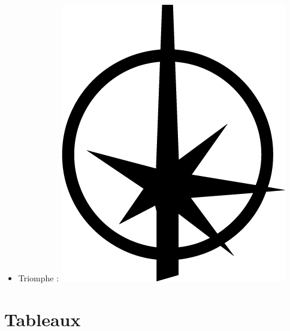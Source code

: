 \documentclass{article}
\begin{document}
\begin{multicols}{3}
\begin{itemize}
		\item Triomphe : {\Large \includegraphics[height=\fontcharht\font`\B]{../img/result_triomphe_triumph}}
	\end{itemize}
\end{multicols}

\part*{Tableaux}
\end{document}
